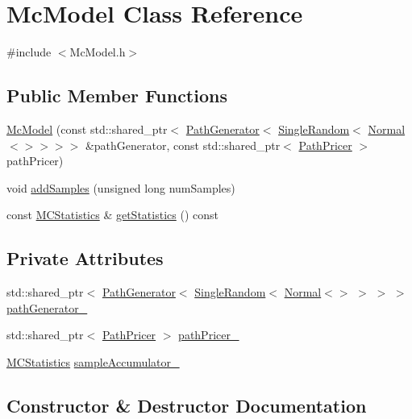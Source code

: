 \hypertarget{class_mc_model}{}\section{Mc\+Model Class Reference}
\label{class_mc_model}


{\ttfamily \#include $<$Mc\+Model.\+h$>$}

\subsection*{Public Member Functions}
\begin{DoxyCompactItemize}
\item 
\hyperlink{class_mc_model_af5a2a0799f0157a7398cde7f60184507}{Mc\+Model} (const std\+::shared\+\_\+ptr$<$ \hyperlink{class_path_generator}{Path\+Generator}$<$ \hyperlink{struct_single_random}{Single\+Random}$<$ \hyperlink{class_normal}{Normal}$<$$>$$>$$>$$>$ \&path\+Generator, const std\+::shared\+\_\+ptr$<$ \hyperlink{class_path_pricer}{Path\+Pricer} $>$ path\+Pricer)
\item 
void \hyperlink{class_mc_model_a81f56ed90c002927bdec595eb52c57c3}{add\+Samples} (unsigned long num\+Samples)
\item 
const \hyperlink{class_m_c_statistics}{M\+C\+Statistics} \& \hyperlink{class_mc_model_afc977c490efd468506d7436901a72177}{get\+Statistics} () const
\end{DoxyCompactItemize}
\subsection*{Private Attributes}
\begin{DoxyCompactItemize}
\item 
std\+::shared\+\_\+ptr$<$ \hyperlink{class_path_generator}{Path\+Generator}$<$ \hyperlink{struct_single_random}{Single\+Random}$<$ \hyperlink{class_normal}{Normal}$<$$>$ $>$ $>$ $>$ \hyperlink{class_mc_model_a79918134182b5642b719bb9e78a5f2fc}{path\+Generator\+\_\+}
\item 
std\+::shared\+\_\+ptr$<$ \hyperlink{class_path_pricer}{Path\+Pricer} $>$ \hyperlink{class_mc_model_a8b4390b3abdd1ffdd121a09f141299f9}{path\+Pricer\+\_\+}
\item 
\hyperlink{class_m_c_statistics}{M\+C\+Statistics} \hyperlink{class_mc_model_aec19a3ee01c95751a50360d264d51def}{sample\+Accumulator\+\_\+}
\end{DoxyCompactItemize}


\subsection{Constructor \& Destructor Documentation}
\hypertarget{class_mc_model_af5a2a0799f0157a7398cde7f60184507}{}\label{class_mc_model_af5a2a0799f0157a7398cde7f60184507} 

